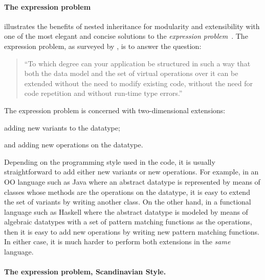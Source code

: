 \paragraph{The expression problem}

\citet{ernst2004expression} illustrates the benefits of nested inheritance for modularity
and extensibility with one of the most elegant and concise solutions to the
\emph{expression problem}~\citep{wadler1998expression}. The expression problem,
as surveyed by \citet{togersen:2004}, is to answer the question:
\begin{quote}
  ``To which degree can your application be structured in such a way that both
  the data model and the set of virtual operations over it can be extended
  without the need to modify existing code, without the need for code repetition
  and without run-time type errors.''
\end{quote}
The expression problem is concerned with two-dimensional extensions:
\begin{inparaenum}[(1)]
\item adding new variants to the datatype;
\item and adding new operations on the datatype.
\end{inparaenum}
Depending on the programming style used in the code, it is usually
straightforward to add either new variants or new operations. For example, in an
OO language such as Java where an abstract datatype is represented by means of
classes whose methods are the operations on the datatype, it is easy to extend
the set of variants by writing another class. On the other hand, in a functional
language such as Haskell where the abstract datatype is modeled by means of
algebraic datatypes with a set of pattern matching functions as the operations,
then it is easy to add new operations by writing new pattern matching functions.
In either case, it is much harder to perform both extensions in the
\textit{same} language.


\paragraph{The expression problem, Scandinavian Style.}

